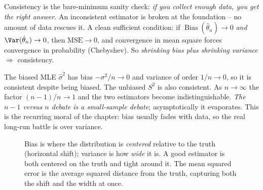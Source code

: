 \begin{intuitionbox}
Consistency is the bare-minimum sanity check: \emph{if you collect enough data,
you get the right answer.} An inconsistent estimator is broken at the
foundation -- no amount of data rescues it. A clean sufficient condition: if
$\operatorname{Bias}(\hat\theta_n)\to 0$ \emph{and}
$\Var(\hat\theta_n)\to 0$, then $\mathrm{MSE}\to 0$, and convergence in mean
square forces convergence in probability (Chebyshev). So \emph{shrinking bias
plus shrinking variance} $\Rightarrow$ consistency.
\end{intuitionbox}

\begin{example}
\label{ch30:ex-consistent-var}
The biased MLE $\hat\sigma^2$ has bias $-\sigma^2/n \to 0$ and variance of order
$1/n \to 0$, so it is consistent despite being biased. The unbiased $S^2$ is
also consistent. As $n\to\infty$ the factor $(n-1)/n\to 1$ and the two estimators
become indistinguishable. \emph{The $n-1$ versus $n$ debate is a small-sample
debate}; asymptotically it evaporates. This is the recurring moral of the
chapter: bias usually fades with data, so the real long-run battle is over
variance.
\end{example}

\begin{figure}[H]
\centering
{}
\caption{Bias is where the distribution is \emph{centered} relative to the truth
(horizontal shift); variance is how \emph{wide} it is. A good estimator is both
centered on the truth and tight around it. The mean squared error is the average
squared distance from the truth, capturing both the shift and the width at once.}
\label{ch30:fig-bias-variance}
\end{figure}

